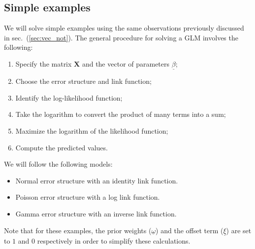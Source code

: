 \documentclass{article}
\begin{document}
\subsection{Simple examples}
We will solve simple examples using the same observations previously discussed in sec.~(\ref{sec:vec_not}). The general procedure for solving a GLM involves the following:
\begin{enumerate}
    \item Specify the matrix $\mathbf{X}$ and the vector of parameters $\underline{\beta}$;
    \item Choose the error structure and link function;
    \item Identify the log-likelihood function;
    \item Take the logarithm to convert the product of many terms into a sum;
    \item Maximize the logarithm of the likelihood function;
    \item Compute the predicted values.
\end{enumerate}
We will follow the following models:
\begin{itemize}
    \item Normal error structure with an identity link function.
    \item Poisson error structure with a log link function.
    \item Gamma error structure with an inverse link function.
\end{itemize}
Note that for these examples, the prior weights ($\underline{\omega}$) and the offset term ($\underline{\xi}$) are set to $1$ and $0$ respectively in order to simplify these calculations.
\end{document}

